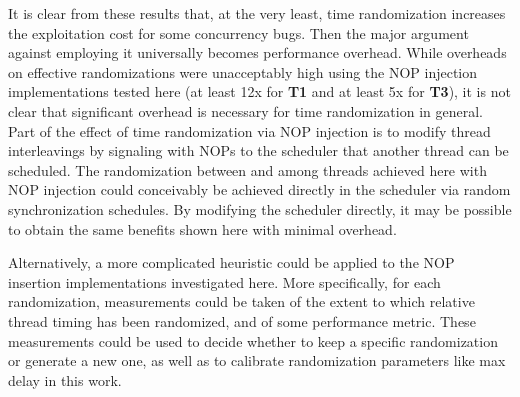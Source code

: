 It is clear from these results that, at the very least, time randomization increases the exploitation cost for some concurrency bugs.
Then the major argument against employing it universally becomes performance overhead.
While overheads on effective randomizations were unacceptably high using the NOP injection implementations tested here (at least 12x for \textbf{T1} and at least 5x for \textbf{T3}), it is not clear that significant overhead is necessary for time randomization in general.
Part of the effect of time randomization via NOP injection is to modify thread interleavings by signaling with NOPs to the scheduler that another thread can be scheduled.
The randomization between and among threads achieved here with NOP injection could conceivably be achieved directly in the scheduler via random synchronization schedules.
By modifying the scheduler directly, it may be possible to obtain the same benefits shown here with minimal overhead.

Alternatively, a more complicated heuristic could be applied to the NOP insertion implementations investigated here.
More specifically, for each randomization, measurements could be taken of the extent to which relative thread timing has been randomized, and of some performance metric.
These measurements could be used to decide whether to keep a specific randomization or generate a new one, as well as to calibrate randomization parameters like max delay in this work.